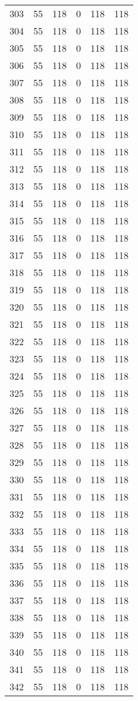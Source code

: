 \documentclass[a4paper]{ctexart}
\begin{document}
\begin{longtable}{p{1cm}|p{2cm}|p{2cm}|p{2cm}|P{2cm}|p{2cm}}
		303&55&118&0&118&118\\
		304&55&118&0&118&118\\
		305&55&118&0&118&118\\
		306&55&118&0&118&118\\
		307&55&118&0&118&118\\
		308&55&118&0&118&118\\
		309&55&118&0&118&118\\
		310&55&118&0&118&118\\
		311&55&118&0&118&118\\
		312&55&118&0&118&118\\
		313&55&118&0&118&118\\
		314&55&118&0&118&118\\
		315&55&118&0&118&118\\
		316&55&118&0&118&118\\
		317&55&118&0&118&118\\
		318&55&118&0&118&118\\
		319&55&118&0&118&118\\
		320&55&118&0&118&118\\
		321&55&118&0&118&118\\
		322&55&118&0&118&118\\
		323&55&118&0&118&118\\
		324&55&118&0&118&118\\
		325&55&118&0&118&118\\
		326&55&118&0&118&118\\
		327&55&118&0&118&118\\
		328&55&118&0&118&118\\
		329&55&118&0&118&118\\
		330&55&118&0&118&118\\
		331&55&118&0&118&118\\
		332&55&118&0&118&118\\
		333&55&118&0&118&118\\
		334&55&118&0&118&118\\
		335&55&118&0&118&118\\
		336&55&118&0&118&118\\
		337&55&118&0&118&118\\
		338&55&118&0&118&118\\
		339&55&118&0&118&118\\
		340&55&118&0&118&118\\
		341&55&118&0&118&118\\
		342&55&118&0&118&118\\

\end{longtable}
\end{document}
